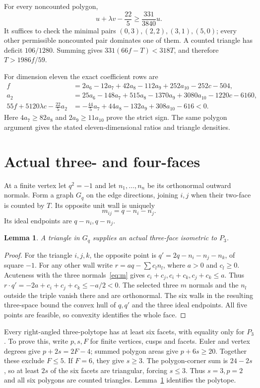 \documentclass[11pt]{article}
\newtheorem{lemma}[theorem]{Lemma}
\begin{document}
For every noncounted polygon,
\[
 u+\lambda v-\frac{22}{5}\ge\frac{331}{3840}u.
\]
It suffices to check the minimal pairs $(0,3),(2,2),(3,1),(5,0)$;
every other permissible noncounted pair dominates one of them.
A counted triangle has deficit $106/1280$.
Summing gives $331(66f-T)<318T$, and therefore $T>1986f/59$.

For dimension eleven the exact coefficient rows are
\begin{align*}
 f&=2a_6-12a_7+42a_8-112a_9+252a_{10}-252c-504,\\
 a_2&=25a_6-148a_7+515a_8-1370a_9+3080a_{10}-1220c-6160,\\
 55f+5120\lambda c-\frac{22}{5}a_2
 &=-\frac{44}{5}a_7+44a_8-132a_9+308a_{10}-616<0.
\end{align*}
Here $4a_7\ge82a_8$ and $2a_9\ge11a_{10}$ prove the strict sign.
The same polygon argument gives the stated eleven-dimensional ratios
and triangle densities.

\section{Actual three- and four-faces}\label{sec:corners}
At a finite vertex let $q^2=-1$ and let $n_1,\ldots,n_n$ be its
orthonormal outward normals. Form a graph $G_q$ on the edge directions,
joining $i,j$ when their two-face is counted by $T$. Its opposite
unit wall is uniquely
\begin{equation}\label{eq:m}
 m_{ij}=q-n_i-n_j.
\end{equation}
Its ideal endpoints are $q-n_i,q-n_j$.

\begin{lemma}\label{lem:p3}
A triangle in $G_q$ supplies an actual three-face isometric to $P_3$.
\end{lemma}
\begin{proof}
For the triangle $i,j,k$, the opposite point is
$q'=2q-n_i-n_j-n_k$, of square $-1$.
For any other wall write $r=a q-\sum c_l n_l$, where $a>0$ and
$c_l\ge0$. Acuteness with the three normals~\eqref{eq:m} gives
$c_i+c_j,c_i+c_k,c_j+c_k\le a$. Thus
$r\cdot q'=-2a+c_i+c_j+c_k\le-a/2<0$.
The selected three $m$ normals and the $n_l$ outside the triple vanish
there and are orthonormal. The six walls in the resulting three-space
bound the convex hull of $q,q'$ and the three ideal endpoints.
All five points are feasible, so convexity identifies the whole face.
\end{proof}

Every right-angled three-polytope has at least six facets, with equality
only for $P_3$. To prove this, write $p,s,F$ for finite vertices, cusps
and facets. Euler and vertex degrees give $p+2s=2F-4$; summed polygon
areas give $p+6s\ge20$. Together these exclude $F\le5$.
If $F=6$, they give $s\ge3$. The polygon-corner sum is $24-2s$, so
at least $2s$ of the six facets are triangular, forcing $s\le3$.
Thus $s=3,p=2$ and all six polygons are counted triangles. Lemma~\ref{lem:p3}
identifies the polytope.
\end{document}

